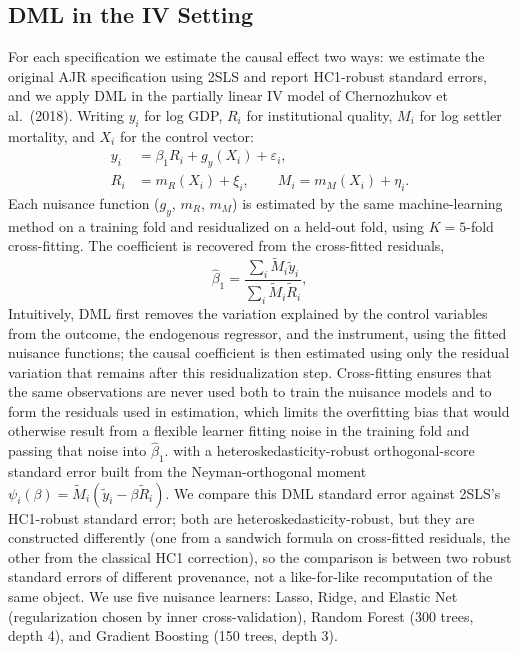 \documentclass[10pt,twocolumn]{article}
\begin{document}
\subsection{DML in the IV Setting}
For each specification we estimate the causal effect two ways: we
estimate the original AJR specification using 2SLS and report
HC1-robust standard errors, and we apply DML in the partially linear IV
model of Chernozhukov et al.\ (2018).
Writing $y_i$ for log GDP, $R_i$ for institutional quality, $M_i$ for
log settler mortality, and $X_i$ for the control vector:
\begin{align}
y_i &= \beta_1 R_i + g_y(X_i) + \varepsilon_i, \\
R_i &= m_R(X_i) + \xi_i, \qquad M_i = m_M(X_i) + \eta_i.
\end{align}
Each nuisance function ($g_y$, $m_R$, $m_M$) is estimated by the same
machine-learning method on a training fold and residualized on a
held-out fold, using $K=5$-fold cross-fitting. The coefficient is
recovered from the cross-fitted residuals,
\begin{equation}
\hat\beta_1 = \frac{\sum_i \tilde M_i \tilde y_i}{\sum_i \tilde M_i \tilde R_i},
\end{equation}
Intuitively, DML first removes the variation explained by the control
variables from the outcome, the endogenous regressor, and the
instrument, using the fitted nuisance functions; the causal coefficient
is then estimated using only the residual variation that remains after
this residualization step. Cross-fitting ensures that the same
observations are never used both to train the nuisance models and to
form the residuals used in estimation, which limits the overfitting
bias that would otherwise result from a flexible learner fitting noise
in the training fold and passing that noise into $\hat\beta_1$.
with a heteroskedasticity-robust orthogonal-score standard error built
from the Neyman-orthogonal moment $\psi_i(\beta)=\tilde M_i(\tilde y_i -
\beta \tilde R_i)$. We compare this DML standard error against 2SLS's
HC1-robust standard error; both are heteroskedasticity-robust, but they
are constructed differently (one from a sandwich formula on
cross-fitted residuals, the other from the classical HC1 correction),
so the comparison is between two robust standard errors of different
provenance, not a like-for-like recomputation of the same object. We
use five nuisance learners: Lasso, Ridge, and Elastic Net (regularization
chosen by inner cross-validation), Random Forest (300 trees, depth 4),
and Gradient Boosting (150 trees, depth 3).
\end{document}
